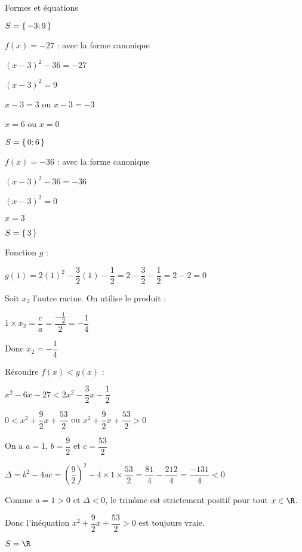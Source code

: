 \begin{EXO}{Formes et équations}{}
\begin{tcbenumerate}[1]
\begin{tcbenumerate}[1][1][alph]
$S = \ensembleDiscret{-3 ; 9}$

\tcbitem $f(x)=-27$ : avec la forme canonique

$(x-3)^2 - 36 = -27$

$(x-3)^2 = 9$

$x-3 = 3$ ou $x-3 = -3$

$x = 6$ ou $x = 0$

$S = \ensembleDiscret{0 ; 6}$

\tcbitem $f(x)=-36$ : avec la forme canonique

$(x-3)^2 - 36 = -36$

$(x-3)^2 = 0$

$x = 3$

$S = \ensembleDiscret{3}$
\end{tcbenumerate}

\tcbitem Fonction $g$ :
\begin{tcbenumerate}[1][1][alph]
\tcbitem $g(1) = 2(1)^2 - \dfrac{3}{2}(1) - \dfrac{1}{2} = 2 - \dfrac{3}{2} - \dfrac{1}{2} = 2 - 2 = 0$ \checkmark

\tcbitem Soit $x_2$ l'autre racine. On utilise le produit :

$1 \times x_2 = \dfrac{c}{a} = \dfrac{-\frac{1}{2}}{2} = -\dfrac{1}{4}$

Donc $x_2 = -\dfrac{1}{4}$
\end{tcbenumerate}

\tcbitem Résoudre $f(x)<g(x)$ :

$x^2 - 6x - 27 < 2x^2 - \dfrac{3}{2}x - \dfrac{1}{2}$

$0 < x^2 + \dfrac{9}{2}x + \dfrac{53}{2}$ ou $x^2 + \dfrac{9}{2}x + \dfrac{53}{2} > 0$

On a $a=1$, $b=\dfrac{9}{2}$ et $c=\dfrac{53}{2}$

$\Delta = b^2-4ac = \left(\dfrac{9}{2}\right)^2-4\times1\times\dfrac{53}{2} = \dfrac{81}{4}-\dfrac{212}{4} = \dfrac{-131}{4} < 0$

Comme $a=1>0$ et $\Delta<0$, le trinôme est strictement positif pour tout $x\in\R$.

Donc l'inéquation $x^2 + \dfrac{9}{2}x + \dfrac{53}{2} > 0$ est toujours vraie.

$S = \R$
\end{tcbenumerate}
\end{EXO}



